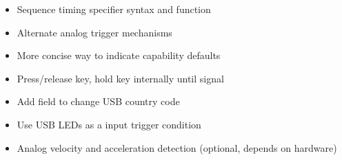 \documentclass{kiibohd-template}
\begin{document}
\begin{itemize}
\item Sequence timing specifier syntax and function
\item Alternate analog trigger mechanisms
\item More concise way to indicate capability defaults
\item Press/release key, hold key internally until signal
\item Add field to change USB country code
\item Use USB LEDs as a input trigger condition
\item Analog velocity and acceleration detection (optional, depends on hardware)

\end{itemize}
\end{document}
